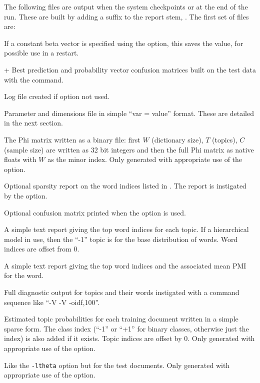 \documentclass[a4paper,english]{article}
\begin{document}
The following files are output when the system checkpoints 
or at the end of the run.
These are built by adding a suffix to the report stem,
.
The first set of files are:
\begin{Description}\setlength{\itemsep}{0cm}
\item[\File{RepStem.beta}]  If a constant beta vector is specified
using the  option, this saves
   the value, for possible use in a restart.
\item[\File{RepStem.cnfs}+\File{RepStem.pcnfs}]  
Best prediction and probability vector confusion matrices
built on the test data with the 
 command.
\item[\File{RepStem.log}] Log file created if  option not used.
\item[\File{RepStem.par}] Parameter and dimensions file in simple ``var = value'' format.  These are detailed in the next section.
\item[\File{RepStem.phi}] The Phi matrix written as a binary file:
first $W$ (dictionary size), $T$ (topics), 
$C$ (sample size) are written as 32 bit integers and
then the full Phi matrix as native floats with $W$ as the minor index.
Only generated with appropriate use of the
 option.
\item[\File{RepStem.smap}] Optional sparsity report on the 
word indices listed in .
The report is instigated by the
 option.
\item[\File{RepStem.tbyc}]  Optional confusion matrix printed when
the  option is used.
\item[\File{RepStem.toplst}] A simple text report giving the top word indices
  for each topic.  If a hierarchical model in use, then the
``-1'' topic is for the base distribution of words.
Word indices are offset from 0.
\item[\File{RepStem.toppmi}] A simple text report giving the top word indices
and the associated mean PMI for the word.
\item[\File{RepStem.topset}] Full diagnostic output for topics and their words
instigated with a command sequence like ``-V -V -oidf,100''.
\item[\File{RepStem.theta}] Estimated topic probabilities 
for each training document
written in a simple sparse form.  The class index
(``-1'' or ``+1'' for binary classes, otherwise just the index)
is also added if it exists.
Topic indices are offset by 0.
Only generated with appropriate use of the
 option.
\item[\File{RepStem.testprob}] 
Like the \texttt{-ltheta} option but for the test documents.
Only generated with appropriate use of the
 option.
\end{Description}
\end{document}
